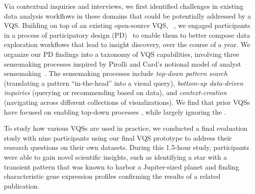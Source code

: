  \par Via contextual inquiries and interviews, we first identified challenges in existing data analysis workflows in these domains
 that could be potentially addressed by a VQS. Building on top of an existing open-source VQS, \zv~\cite{Siddiqui2017,Siddiqui2017VLDB}, we engaged participants in a process of participatory design (PD)~\cite{Muller1993,BodkerGronbaek,HoltzblattJones} to enable them to better compose data exploration workflows that lead to insight discovery, over the course of a year. We organize our PD findings into a taxonomy of VQS capabilities, involving three sensemaking processes inspired by Pirolli and Card's notional model of analyst sensemaking~\cite{Pirolli}. The sensemaking processes include \emph{top-down pattern search} (translating a pattern ``in-the-head'' into a visual query), \emph{bottom-up data-driven inquiries} (querying or recommending based on data), and \emph{context-creation} (navigating across different collections of visualizations). We find that prior VQSs have focused on enabling top-down processes , while largely ignoring the .
 \par To study how various VQSs are used in practice,
 we conducted a final evaluation study with nine participants
 using our final VQS prototype to address their research questions
 on their own datasets.
 During this 1.5-hour study, participants were able to
 gain novel scientific insights,
 such as identifying a star with a transient pattern
 that was known to harbor a Jupiter-sized planet
 and finding characteristic gene expression profiles confirming the results of a related publication. 
 
